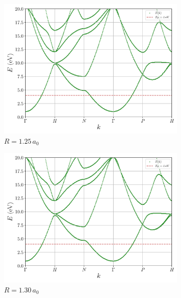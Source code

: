 \documentclass[a4paper,DIV=12,english]{scrartcl}
\begin{document}
\begin{figure}
    \centering 
    \begin{subfigure}{0.49\textwidth}
        \centering 
        \includegraphics[width=\textwidth]{../plots/bs_2_R_125.pdf}
        \caption{$R=1.25\,a_0$}
        \label{subfig:bs_2_125}
    \end{subfigure}
    \begin{subfigure}{0.49\textwidth}
        \centering 
        \includegraphics[width=\textwidth]{../plots/bs_2_R_130.pdf}
        \caption{$R=1.30\,a_0$}
        \label{subfig:bs_2_130}
    \end{subfigure}
    \begin{subfigure}{0.49\textwidth}
        \centering 

\end{subfigure}
\end{figure}
\end{document}
